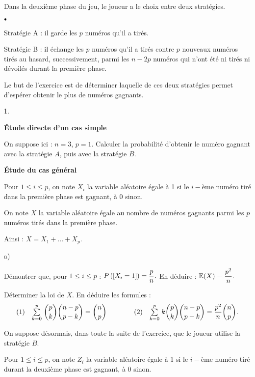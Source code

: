 \documentclass[11pt]{article}%
\begin{document}
Dans la deuxième phase du jeu, le joueur a le choix entre deux
stratégies.

\begin{noliste}{$\scriptstyle \bullet$}
\item {Stratégie }A : il garde les $p$ numéros qu'il a tirés.

\item Stratégie B : il échange les $p$ numéros qu'il a tirés
contre $p$ nouveaux numéros tirés au hasard, successivement, parmi
les $n-2p$ numéros qui n'ont été ni tirés ni dévoilés durant la
première phase.
\end{noliste}

Le but de l'exercice est de déterminer laquelle de ces deux stratégies
permet d'espérer obtenir le plus de numéros gagnants.

\begin{noliste}{1.}
 \setlength{\itemsep}{4mm}
\item \textbf{Étude directe d'un cas simple}

On suppose ici : $n = 3$, $p = 1$. Calculer la probabilité d'obtenir le
numéro gagnant avec la stratégie $A$, puis avec la stratégie $B$.

\item \textbf{Étude du cas général}

Pour $1\leq i\leq p$, on note $X_{i}$ la variable aléatoire égale 
à 1 si le $i-$ème numéro tiré dans la première phase est
gagnant, à 0 sinon.

On note $X$ la variable aléatoire égale au nombre de numéros
gagnants parmi les $p$ numéros tirés dans la première phase.

Ainsi : $X = X_{1} + \ldots + X_{p}$.

\begin{noliste}{a)}
 \setlength{\itemsep}{2mm}
\item Démontrer que, pour $1\leq i\leq p$ : $P\left(\left[ {X_{i} =
1} \right]\right) = \dfrac{p}{n}.$
En déduire : $\mathbb{E}(X) = \dfrac{p^{2}}{n}.$

\item Déterminer la loi de $X$. En déduire les formules : 
\[
(1)\quad {\textstyle\sum\limits_{k = 0}^{p}}\hspace{.1cm}\binom{p}{k}\binom{n-p}{p-k} =
\binom{n}{p}\qquad
\qquad (2)\quad {\textstyle\sum\limits_{k = 0}^{p}}\hspace{.1cm}k\binom{p}{k}\binom{n-p}{p-k} =
\frac{p^{2}}{n}\binom{n}{p}.
\]
\end{noliste}

On suppose désormais, dans toute la suite de l'exercice, que le joueur
utilise la stratégie $B$.

Pour $1\leq i\leq p$, on note $Z_{i}$ la variable aléatoire égale 
à 1 si le $i-$ème numéro tiré durant la deuxième phase
est gagnant, à 0 sinon.


\end{noliste}
\end{document}
